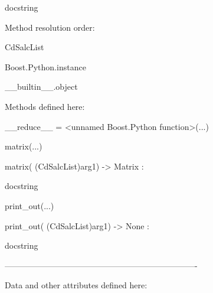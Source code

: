 \documentclass[letterpaper,10pt,english]{sphinxmanual}
\begin{document}
\begin{description}
\begin{description}
\item[{class CdSalcList(Boost.Python.instance)}] \leavevmode
\begin{DUlineblock}{0em}
\item[] docstring
\item[] 
\item[] Method resolution order:
\item[]
\begin{DUlineblock}{\DUlineblockindent}
\item[] CdSalcList
\item[] Boost.Python.instance
\item[] \_\_builtin\_\_.object
\item[] 
\end{DUlineblock}
\item[] Methods defined here:
\item[] 
\item[] \_\_reduce\_\_ = \textless{}unnamed Boost.Python function\textgreater{}(...)
\item[] 
\item[] matrix(...)
\item[]
\begin{DUlineblock}{\DUlineblockindent}
\item[] matrix( (CdSalcList)arg1) -\textgreater{} Matrix :
\item[]
\begin{DUlineblock}{\DUlineblockindent}
\item[] docstring
\item[] 
\end{DUlineblock}
\end{DUlineblock}
\item[] print\_out(...)
\item[]
\begin{DUlineblock}{\DUlineblockindent}
\item[] print\_out( (CdSalcList)arg1) -\textgreater{} None :
\item[]
\begin{DUlineblock}{\DUlineblockindent}
\item[] docstring
\item[] 
\end{DUlineblock}
\end{DUlineblock}
\item[] ----------------------------------------------------------------------
\item[] Data and other attributes defined here:
\item[] 

\end{DUlineblock}
\end{description}
\end{description}
\end{document}
